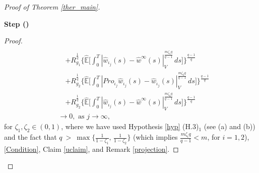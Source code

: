 \documentclass[english,a4paper,11pt]{amsart}
\theoremstyle{plain}
\theoremstyle{definition}
\theoremstyle{remark}
\numberwithin{equation}{section}
\newcounter{lil1}
\newenvironment{step}
{\begin{list} { \bf Step (\Roman{lil1})}
		{ \usecounter{lil1}
			\setlength{\leftmargin}{0.0cm}
			\setlength{\topsep}{0.2cm}
			\setlength{\itemsep}{0.0cm}
			\setlength{\parsep}{0.1cm}
			\setlength{\itemindent}{0.8cm}
			\setlength{\parskip}{0.0cm}}}
	{\end{list}}
\newcounter{lil33}
\newcounter{lil1q}
\newcommand{\wh}{\widehat}
\newcommand{\EE}{ \mathbb{E} }
\newcommand{\Pro}{Pro}
\begin{document}
\begin{proof}[Proof of Theorem \ref{ther_main}]
\begin{step}
\begin{proof}
\begin{align*}
			\\&\quad   {+
				R_{g_1}^{\frac{1}{q}}\bigg\{	\wh{\EE}\bigg[\int_0^T | \wh{w}_{\iota_j}(s)- \wh{w}^\infty(s) | _{V}^{\frac{m\zeta_1q}{q-1}}\,ds\bigg]\bigg\}^{\frac{q-1}{q}  }}
			\\&\quad  {+
				R_{g_2}^{\frac{1}{q}}\bigg\{	\wh{\EE}\bigg[\int_0^T | \Pro_{\iota_j} \wh{w}_{\iota_j}(s)- \wh{w}_{\iota_j}(s) | _{V}^{\frac{m\zeta_2q}{q-1}}\,ds\bigg]\bigg\}^{\frac{q-1}{q}  }}
			\\&\quad   {+
				R_{g_2}^{\frac{1}{q} }\bigg\{	\wh{\EE}\bigg[\int_0^T | \wh{w}_{\iota_j}(s)- \wh{w}^\infty(s) | _{V}^{\frac{m\zeta_2q}{q-1}}\,ds\bigg]\bigg\}^{\frac{q-1}{q}  }}\\&    { \to 0, \text{ as } j\to \infty,}
		\end{align*}for $\zeta_1,\zeta_2\in (0,1)$, where we have used Hypothesis \ref{hyp} (H.3)$_1$ (see (a) and (b)) and the fact that {$q\ >\ \max\!\big\{\tfrac{1}{1-\zeta_1},\,\tfrac{1}{1-\zeta_2}\big\}$} \big(which implies $\frac{m\zeta_i q}{q-1}<m$, for $i=1,2$\big), \eqref{Condition}, Claim \ref{uclaim}, and Remark \ref{projection}.
\end{proof}





\end{step}
\end{proof}
\end{document}
